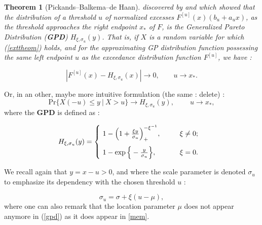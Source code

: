 \documentclass[11pt,a4paper,openany ]{book}
\newtheorem{theorem}{Theorem}[chapter]
\begin{document}
\begin{theorem}[Pickands–Balkema–de Haan]
	discovered by \emph{\cite{balkema_residual_1974}} and\emph{\cite{iii_statistical_1975-1}}
	which showed that the distribution of a threshold $u$ of normalized excesses $F^{[u]}(x)(b_u+a_ux)$, as the threshold approaches the right endpoint $x_*$ of $F$, is the Generalized Pareto Distribution (\textbf{GPD}) $H_{\xi,\sigma_u}(y)$. That is, if $X$ is a random variable for which (\ref{exttheom}) holds, and for the approximating GP distribution function possessing the same left endpoint $u$ as the exceedance distribution function $F^{[u]}$, we have \emph{\citet[pp.27]{reiss_statistical_2007}}: 
	
	\begin{equation*}
	|F^{[u]}(x)-H_{\xi,\sigma_u}(x)|\longrightarrow 0, \ \ \ \ \ \ \ \ \ u\to x_*.
	\end{equation*}
\end{theorem}
Or, in an other, maybe more intuitive formulation (the same : delete) \cite{coles_introduction_2001} :
\begin{equation} \label{gpdconv}
\text{Pr}\big\{X(-u)\leq y\ |\ X>u\big\}\longrightarrow H_{\xi,\sigma_u}(y), \ \ \ \ \ \ \ \ \ \ u\to x_*,
\end{equation}
where the \textbf{GPD} is defined as :


\begin{equation}\label{gpdeq}
H_{\xi,\sigma_u}(y)=
\renewcommand{\arraystretch}{0.6}\left\{\begin{array}{@{}l@{\quad}l@{}}
\ 1-\Big(1+\frac{\xi y}{\sigma_u}\Big)_+^{-\xi^{-1}}, \ \ \ \ \ \  \ \ \xi\neq 0; \\ 
\vspace{0.0002cm} \\
\ 1-\exp\Big\{-\frac{y}{\sigma_u}\Big\}, \ \ \ \ \ \ \ \ \ \ \xi=0.

\end{array}\right.\kern-\nulldelimiterspace
\end{equation}


We recall again that $y = x-u >0$, and where the scale parameter is denoted $\sigma_u$ to emphasize its dependency with the chosen threshold $u$ :

\begin{equation}
\sigma_{u}=\sigma+\xi (u-\mu),
\end{equation}
where one can also remark that the location parameter $\mu$ does not appear anymore in (\ref{gpd}) as it does appear in \ref{mem}. 
\end{document}
